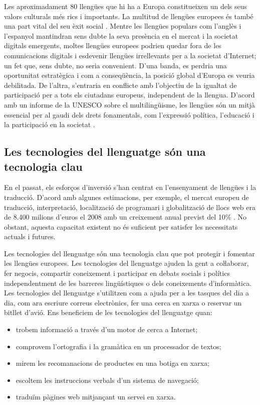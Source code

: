 \begin{multicols}{2}
Les aproximadament 80 llengües que hi ha a Europa constitueixen un dels seus valors culturals més rics i importants. La multitud de llengües europees és també una part vital del seu èxit social \cite{CAT-Nota2}. Mentre les llengües populars com l’anglès i l’espanyol mantindran sens dubte la seva presència en el mercat i la societat digitals emergents, moltes llengües europees podrien quedar fora de les comunicacions digitals i esdevenir llengües irrellevants per a la societat d'Internet; un fet que, sens dubte, no seria convenient.  D’una banda, es perdria una oportunitat estratègica i com a conseqüència, la posició global d’Europa es veuria debilitada. De l’altra, s’entraria en conflicte amb l’objectiu de la igualtat de participació per a tots els ciutadans europeus, independent de la llengua. D’acord amb un informe de la UNESCO sobre el multilingüisme, les llengües són un mitjà essencial per al gaudi dels drets fonamentals, com l’expressió política, l’educació i la participació en la societat \cite{CAT-Nota3}.

\subsection{Les tecnologies del llenguatge són una tecnologia clau}

En el passat, els esforços d’inversió s’han centrat en l’ensenyament de llengües i la traducció. D’acord amb algunes estimacions, per exemple, el mercat europeu de traducció, interpretació, localització de programari i globalització de llocs web era de 8.400 milions d’euros el 2008 amb un creixement anual previst del 10\% \cite{CAT-Nota3}. No obstant, aquesta capacitat existent no és suficient per satisfer les necessitats actuals i futures. 

Les tecnologies del llenguatge són una tecnologia clau que pot protegir i fomentar les llengües europees. Les tecnologies del llenguatge ajuden la gent a coŀlaborar, fer negocis, compartir coneixement i participar en debats socials i polítics independentment de les barreres lingüístiques o dels coneixements d’informàtica. Les tecnologies del llenguatge s’utilitzen com a ajuda per a les tasques del dia a dia, com ara escriure correus electrònics, fer una cerca en xarxa o reservar un bitllet d’avió. Ens beneficiem de les tecnologies del llenguatge quan:

\begin{itemize}
\item trobem informació a través d’un motor de cerca a Internet;
\item comprovem l’ortografia i la gramàtica en un processador de textos;
\item mirem les recomanacions de productes en una botiga en xarxa;
\item escoltem les instruccions verbals d'un sistema de navegació;
\item traduïm pàgines web mitjançant un servei en xarxa.
\end{itemize}


\end{multicols}
